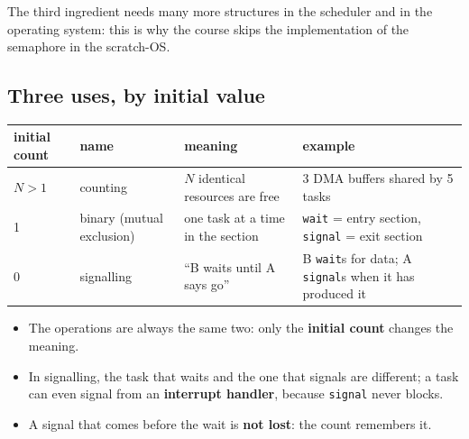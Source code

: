The third ingredient needs many more structures in the scheduler and in the operating system: this is why the course skips the implementation of the semaphore in the scratch-OS.

\subsection{Three uses, by initial value}
\begin{center}
\small
\begin{tabular}{P{0.11} P{0.2} P{0.28} P{0.33}}
    \hline
    \textbf{initial count} & \textbf{name} & \textbf{meaning} & \textbf{example} \\
    \hline
    $N > 1$ & counting & $N$ identical resources are free & 3 DMA buffers shared by 5 tasks \\
    1 & binary (mutual exclusion) & one task at a time in the section & \texttt{wait} = entry section, \texttt{signal} = exit section \\
    0 & signalling & ``B waits until A says go'' & B \texttt{wait}s for data; A \texttt{signal}s when it has produced it \\
    \hline
\end{tabular}
\end{center}
\begin{itemize}
    \item The operations are always the same two: only the \textbf{initial count} changes the meaning.
    \item In signalling, the task that waits and the one that signals are different; a task can even signal from an \textbf{interrupt handler}, because \texttt{signal} never blocks.
    \item A signal that comes before the wait is \textbf{not lost}: the count remembers it.
\end{itemize}

